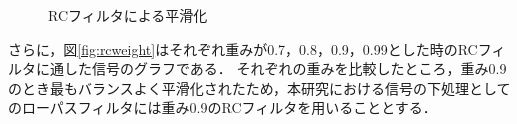 \begin{figure}[h]
  \caption{RCフィルタによる平滑化}
  \label{fig:rcfiltered}
\end{figure}

さらに，図\ref{fig:rcweight}はそれぞれ重みが0.7，0.8，0.9，0.99とした時のRCフィルタに通した信号のグラフである．
それぞれの重みを比較したところ，重み0.9のとき最もバランスよく平滑化されたため，本研究における信号の下処理としてのローパスフィルタには重み0.9のRCフィルタを用いることとする．

